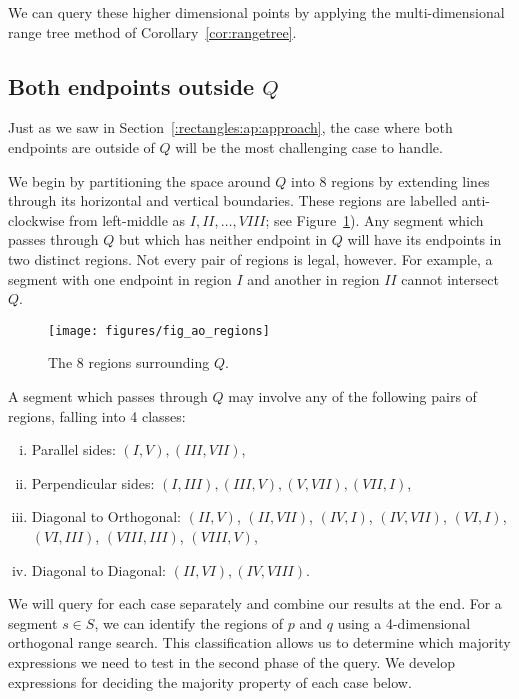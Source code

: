 We can query these higher dimensional points by applying the multi-dimensional range tree method of Corollary~\ref{cor:rangetree}.


\subsection{Both endpoints outside $Q$}
\label{:rectangles:ao:bothout}

Just as we saw in Section~\ref{:rectangles:ap:approach}, the case where both endpoints are outside of $Q$ will be the most challenging case to handle.

We begin by partitioning the space around $Q$ into 8 regions by extending lines through its horizontal and vertical boundaries. These regions are labelled anti-clockwise from left-middle as $I, II, \ldots, VIII$; see Figure~\ref{fig:rectangles:ao:regions}). Any segment which passes through $Q$ but which has neither endpoint in $Q$ will have its endpoints in two distinct regions. Not every pair of regions is legal, however. For example, a segment with one endpoint in region $I$ and another in region $II$ cannot intersect $Q$.

\begin{figure}[t]
\begin{center}
  \texttt{[image: figures/fig\_ao\_regions]}
  \caption{The 8 regions surrounding $Q$.}
  \label{fig:rectangles:ao:regions}
\end{center}
\end{figure}

A segment which passes through $Q$ may involve any of the following pairs of regions, falling into 4 classes:

\begin{enumerate}[i.]
\item Parallel sides: $(I, V), (III, VII)$,
\item Perpendicular sides: $(I, III), (III, V), (V,VII), (VII, I)$,
\item Diagonal to Orthogonal: $(II, V)$, $(II, VII)$, $(IV, I)$, $(IV,VII)$, $(VI, I)$, $(VI, III)$, $(VIII, III)$, $(VIII, V)$,
\item Diagonal to Diagonal: $(II, VI), (IV, VIII)$.
\end{enumerate}

We will query for each case separately and combine our results at the end. For a segment $s \in S$, we can identify the regions of $p$ and $q$ using a 4-dimensional orthogonal range search. This classification allows us to determine which majority expressions we need to test in the second phase of the query. We develop expressions for deciding the majority property of each case below.

